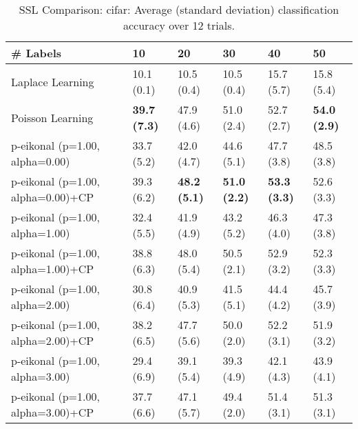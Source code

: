 \documentclass{article}
\begin{document}
\begin{table*}[t!]
\vspace{-3mm}
\caption{SSL Comparison: cifar: Average (standard deviation) classification accuracy over 12 trials.}
\vspace{-3mm}
\label{tab:SSL Comparison: cifar}
\vskip 0.15in
\begin{center}
\begin{small}
\begin{sc}
\begin{tabular}{llllll}
\toprule
\# Labels&\textbf{10}&\textbf{20}&\textbf{30}&\textbf{40}&\textbf{50}\\
\midrule
Laplace Learning&10.1 (0.1)      &10.5 (0.4)      &10.5 (0.4)      &15.7 (5.7)      &15.8 (5.4)      \\
Poisson Learning&{\bf 39.7 (7.3)}&47.9 (4.6)      &51.0 (2.4)      &52.7 (2.7)      &{\bf 54.0 (2.9)}\\
p-eikonal (p=1.00, alpha=0.00)&33.7 (5.2)      &42.0 (4.7)      &44.6 (5.1)      &47.7 (3.8)      &48.5 (3.8)      \\
p-eikonal (p=1.00, alpha=0.00)+CP&39.3 (6.2)      &{\bf 48.2 (5.1)}&{\bf 51.0 (2.2)}&{\bf 53.3 (3.3)}&52.6 (3.3)      \\
p-eikonal (p=1.00, alpha=1.00)&32.4 (5.5)      &41.9 (4.9)      &43.2 (5.2)      &46.3 (4.0)      &47.3 (3.8)      \\
p-eikonal (p=1.00, alpha=1.00)+CP&38.8 (6.3)      &48.0 (5.4)      &50.5 (2.1)      &52.9 (3.2)      &52.3 (3.3)      \\
p-eikonal (p=1.00, alpha=2.00)&30.8 (6.4)      &40.9 (5.3)      &41.5 (5.1)      &44.4 (4.2)      &45.7 (3.9)      \\
p-eikonal (p=1.00, alpha=2.00)+CP&38.2 (6.5)      &47.7 (5.6)      &50.0 (2.0)      &52.2 (3.1)      &51.9 (3.2)      \\
p-eikonal (p=1.00, alpha=3.00)&29.4 (6.9)      &39.1 (5.4)      &39.3 (4.9)      &42.1 (4.3)      &43.9 (4.1)      \\
p-eikonal (p=1.00, alpha=3.00)+CP&37.7 (6.6)      &47.1 (5.7)      &49.4 (2.0)      &51.4 (3.1)      &51.3 (3.1)      \\
\bottomrule
\end{tabular}
\end{sc}
\end{small}
\end{center}
\vskip -0.1in
\end{table*}
\end{document}
